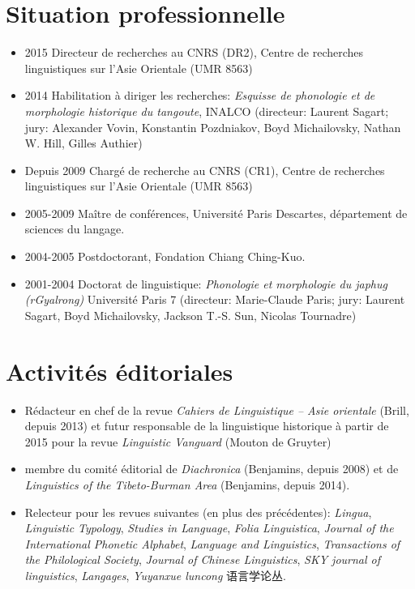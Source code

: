 \documentclass[oldfontcommands,oneside,a4paper,11pt]{article}
\newcommand{\zh}[1]{{\cn #1}}
\begin{document}
\section*{Situation professionnelle}
\begin{itemize}
\item 2015 Directeur de recherches au CNRS (DR2), Centre de recherches linguistiques sur l'Asie Orientale (UMR 8563)
\item 2014 Habilitation à diriger les recherches: \textit{Esquisse de phonologie et de morphologie historique du tangoute}, INALCO  (directeur: Laurent Sagart; jury: Alexander Vovin, Konstantin Pozdniakov, Boyd Michailovsky, Nathan W. Hill, Gilles Authier)
\item Depuis 2009 Chargé de recherche au CNRS (CR1), Centre de recherches linguistiques sur l'Asie Orientale (UMR 8563)
\item 2005-2009 Maître de conférences, Université Paris Descartes, département de sciences du langage.
\item 2004-2005 Postdoctorant, Fondation Chiang Ching-Kuo.
\item 2001-2004 Doctorat de linguistique: \textit{Phonologie et morphologie du japhug (rGyalrong)} Université Paris 7 (directeur: Marie-Claude Paris; jury: Laurent Sagart, Boyd Michailovsky, Jackson T.-S. Sun, Nicolas Tournadre)
\end{itemize}
 
 
  
  
 
\section*{Activités éditoriales}
\begin{itemize}
\item Rédacteur en chef de la revue \textit{Cahiers de Linguistique -- Asie orientale} (Brill, depuis 2013) et futur responsable de la linguistique historique à partir de 2015 pour la revue \textit{Linguistic Vanguard} (Mouton de Gruyter)
\item membre du comité éditorial de \textit{Diachronica} (Benjamins, depuis 2008) et de \textit{Linguistics of the Tibeto-Burman Area}  (Benjamins, depuis 2014).
\item Relecteur pour les revues suivantes (en plus des précédentes): \textit{Lingua}, \textit{Linguistic Typology}, \textit{Studies in Language}, \textit{Folia Linguistica}, \textit{Journal of the International Phonetic Alphabet},  \textit{Language and Linguistics}, \textit{Transactions of the Philological Society}, \textit{Journal of Chinese Linguistics}, \textit{SKY journal of linguistics}, \textit{Langages}, \textit{Yuyanxue luncong} \zh{语言学论丛}.
\end{itemize}
\end{document}
